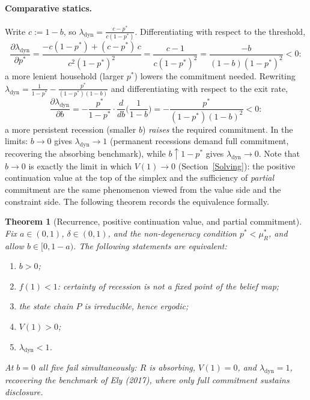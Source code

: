 \documentclass[12pt]{article}
\newtheorem{thm}{Theorem}
\begin{document}
\paragraph{Comparative statics.} Write $c := 1-b$, so $\lambda_{\mathrm{dyn}} = \tfrac{c-p^*}{c(1-p^*)}$. Differentiating with respect to the threshold,
\[
\frac{\partial\lambda_{\mathrm{dyn}}}{\partial p^*}
= \frac{-c(1-p^*) + (c-p^*)\,c}{c^2(1-p^*)^2}
= \frac{c-1}{c(1-p^*)^2}
= \frac{-b}{(1-b)(1-p^*)^2} < 0 :
\]
a more lenient household (larger $p^*$) lowers the commitment needed. Rewriting $\lambda_{\mathrm{dyn}} = \tfrac{1}{1-p^*} - \tfrac{p^*}{(1-p^*)(1-b)}$ and differentiating with respect to the exit rate,
\[
\frac{\partial\lambda_{\mathrm{dyn}}}{\partial b}
= -\frac{p^*}{1-p^*}\cdot\frac{d}{db}\Big(\frac{1}{1-b}\Big)
= -\frac{p^*}{(1-p^*)(1-b)^2} < 0 :
\]
a more persistent recession (smaller $b$) \emph{raises} the required commitment. In the limits: $b\to 0$ gives $\lambda_{\mathrm{dyn}} \to 1$ (permanent recessions demand full commitment, recovering the absorbing benchmark), while $b \uparrow 1-p^*$ gives $\lambda_{\mathrm{dyn}} \to 0$. Note that $b\to 0$ is exactly the limit in which $V(1)\to 0$ (Section~\ref{Solving}): the positive continuation value at the top of the simplex and the sufficiency of \emph{partial} commitment are the same phenomenon viewed from the value side and the constraint side. The following theorem records the equivalence formally.

\begin{thm}[Recurrence, positive continuation value, and partial commitment]\label{thm:equiv}
Fix $a\in(0,1)$, $\delta\in(0,1)$, and the non-degeneracy condition $p^*<\mu_R^*$, and allow $b\in[0,1-a)$. The following statements are equivalent:
\begin{enumerate}
\item[(i)] $b>0$;
\item[(ii)] $f(1)<1$: certainty of recession is not a fixed point of the belief map;
\item[(iii)] the state chain $P$ is irreducible, hence ergodic;
\item[(iv)] $V(1)>0$;
\item[(v)] $\lambda_{\mathrm{dyn}}<1$.
\end{enumerate}
At $b=0$ all five fail simultaneously: $R$ is absorbing, $V(1)=0$, and $\lambda_{\mathrm{dyn}}=1$, recovering the benchmark of Ely (2017), where only full commitment sustains disclosure.
\end{thm}
\end{document}
